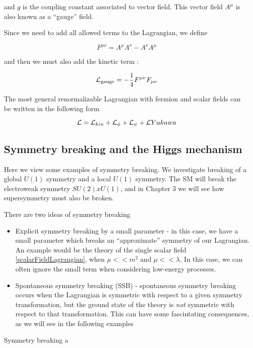 and $g $ is the coupling constant associated to vector field.
This vector field $A^\mu$ is also known as a ``gauge'' field.

Since we need to add all allowed terms to the Lagrangian, we define

\begin{equation}
F^{\mu\nu} = A^\mu A^\nu - A^\nu A^\mu
\end{equation}

and then we must also add the kinetic term :

\begin{equation}
\mathcal{L}_{\text{gauge}} = - \frac{1}{4} F^{\mu\nu} F_{\mu\nu}
\end{equation}

The most general renormalizable Lagrangian with fermion and scalar fields can be written in the following form

\begin{equation}
\mathcal{L} = \mathcal{L}_{kin} + \mathcal{L}_{\phi} + \mathcal{L}_\psi +   \mathcal{L}{Yukawa}
\end{equation}

\subsection{Symmetry breaking and the Higgs mechanism}
\label{subsec:symmetry_breaking}
Here we view some examples of symmetry breaking.
We investigate breaking of a global $U(1)$ symmetry and a local $U(1)$ symmetry.
The SM will break the electroweak symmetry $SU(2) x U(1)$, and in Chapter 3 we will see how supersymmetry must also be broken.

There are two ideas of symmetry breaking
\begin{itemize}
\item Explicit symmetry breaking by a small parameter - in this case, we have a small parameter which breaks an ``approximate'' symmetry of our Lagrangian.
An example would be the theory of the single scalar field \ref{scalarFieldLagrangian}, when $\mu << m^2$ and $\mu << \lambda$.
In this case, we can often ignore the small term when considering low-energy processes.
\item Spontaneous symmetry breaking (SSB) - spontaneous symmetry breaking occurs when the Lagrangian is symmetric with respect to a given symmetry transformation, but the ground state of the theory is \textit{not} symmetric with respect to that transformation.
This can have some fascintating consequences, as we will see in the following examples
\end{itemize}
Symmetry breaking a

